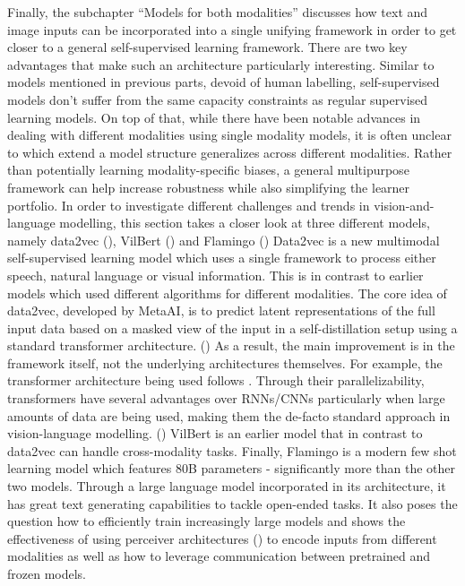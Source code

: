 \documentclass[
]{krantz}
\begin{document}
Finally, the subchapter ``Models for both modalities'' discusses how text and image inputs can be incorporated into a single unifying framework in order to get closer to a general self-supervised learning framework.
There are two key advantages that make such an architecture particularly interesting.
Similar to models mentioned in previous parts, devoid of human labelling, self-supervised models don't suffer from the same capacity constraints as regular supervised learning models.
On top of that, while there have been notable advances in dealing with different modalities using single modality models, it is often unclear to which extend a model structure generalizes across different modalities.
Rather than potentially learning modality-specific biases, a general multipurpose framework can help increase robustness while also simplifying the learner portfolio.
In order to investigate different challenges and trends in vision-and-language modelling,
this section takes a closer look at three different models, namely data2vec (\citet{baevski2022data2vec}), VilBert (\citet{lu2019vilbert}) and Flamingo (\citet{alayrac2022flamingo})
Data2vec is a new multimodal self-supervised learning model which uses a single framework to process either speech, natural language or visual information.
This is in contrast to earlier models which used different algorithms for different modalities.
The core idea of data2vec, developed by MetaAI, is to predict latent representations of the full input data based on a masked view of the input in a self-distillation setup using a standard transformer architecture. (\citet{baevski2022data2vec})
As a result, the main improvement is in the framework itself, not the underlying architectures themselves.
For example, the transformer architecture being used follows \citet{vaswani2017attention}.
Through their parallelizability, transformers have several advantages over RNNs/CNNs particularly when
large amounts of data are being used, making them the de-facto standard approach in vision-language modelling. (\citet{dosovitskiy2020image})
VilBert is an earlier model that in contrast to data2vec can handle cross-modality tasks.
Finally, Flamingo is a modern few shot learning model which features 80B parameters -
significantly more than the other two models. Through a large language model incorporated in its architecture, it has great text generating capabilities to tackle open-ended tasks. It also poses the question how to efficiently train increasingly large models and shows the effectiveness of using perceiver architectures (\citet{jaegle2021perceiver}) to encode inputs from different modalities as well as how to leverage communication between pretrained and frozen models.
\end{document}
